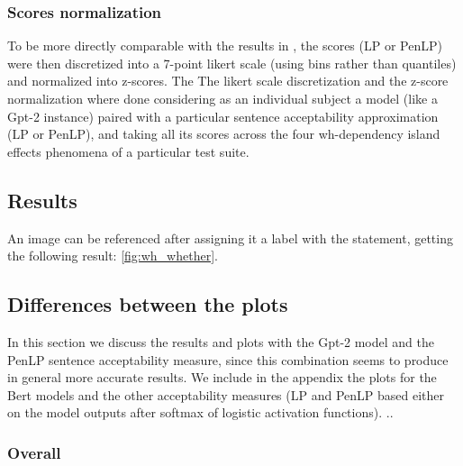 \subsubsection{Scores normalization}

To be more directly comparable with the results in \citet{sprouse2016experimental}, the scores (LP or PenLP) were then discretized into a 7-point likert scale (using bins rather than quantiles) and normalized into z-scores.
The The likert scale discretization and the z-score normalization where done considering as an individual subject a model (like a Gpt-2 instance) paired with a particular sentence acceptability approximation (LP or PenLP), and taking all its scores across the four wh-dependency island effects phenomena of a particular test suite.

\subsection{Results}


An image can be referenced after assigning it a label with the statement, getting the following result: \autoref{fig:wh_whether}.



\subsection{Differences between the plots}

In this section we discuss the results and plots with the Gpt-2 model and the PenLP sentence acceptability measure, since this combination seems to produce in general more accurate results. We include in the appendix the plots for the Bert models and the other acceptability measures (LP and PenLP based either on the model outputs after softmax of logistic activation functions).
..
\subsubsection{Overall}

